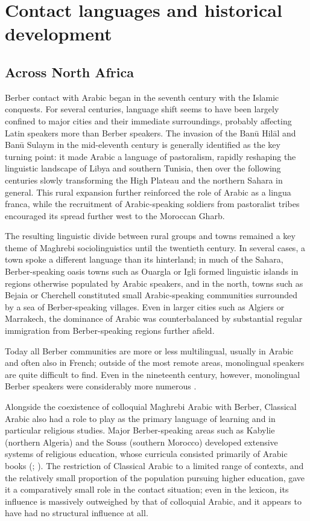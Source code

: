\documentclass[output=paper]{langsci/langscibook}
\begin{document}
 \section{Contact languages and historical development}


 \subsection{Across North Africa} \label{na}


Berber contact with Arabic began in the seventh century with the Islamic conquests. For several centuries, language shift seems to have been largely confined to major cities and their immediate surroundings, probably affecting Latin speakers more than Berber speakers. The invasion of the Banū Hilāl and Banū Sulaym in the mid-eleventh century is generally identified as the key turning point: it made Arabic a language of pastoralism, rapidly reshaping the linguistic landscape of Libya and southern Tunisia, then over the following centuries slowly transforming the High Plateau and the northern Sahara in general.  This rural expansion further reinforced the role of Arabic as a lingua franca, while the recruitment of Arabic-speaking soldiers from pastoralist tribes encouraged its spread further west to the Moroccan Gharb.

The resulting linguistic divide between rural groups and towns remained a key theme of Maghrebi sociolinguistics until the twentieth century. In several cases, a town spoke a different language than its hinterland; in much of the Sahara, Berber-speaking oasis towns such as Ouargla or Igli formed linguistic islands in regions otherwise populated by Arabic speakers, and in the north, towns such as Bejaia or Cherchell constituted small Arabic-speaking communities surrounded by a sea of Berber-speaking villages. Even in larger cities such as Algiers or Marrakech, the dominance of Arabic was counterbalanced by substantial regular immigration from Berber-speaking regions further afield.

Today all Berber communities are more or less multilingual, usually in Arabic and often also in French; outside of the most remote areas, monolingual speakers are quite difficult to find. Even in the nineteenth century, however, monolingual Berber speakers were considerably more numerous \citep[41]{Kossmann2013book}.

Alongside the coexistence of colloquial Maghrebi Arabic with Berber, Classical Arabic also had a role to play as the primary language of learning and in particular religious studies.  Major Berber-speaking areas such as Kabylie (northern Algeria) and the Souss (southern Morocco) developed extensive systems of religious education, whose curricula consisted primarily of Arabic books (\citealt{Boogert1997}; \citealt{Mechehed2007}). The restriction of Classical Arabic to a limited range of contexts, and the relatively small proportion of the population pursuing higher education, gave it a comparatively small role in the contact situation; even in the lexicon, its influence is massively outweighed by that of colloquial Arabic, and it appears to have had no structural influence at all.
\end{document}
